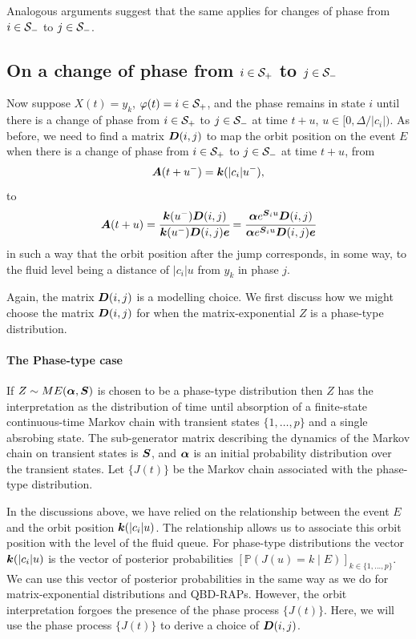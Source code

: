 Analogous arguments suggest that the same applies for changes of phase from \(i\in\mathcal{S}_-\) to \(j\in\mathcal{S}_-\). 

\subsection{On a change of phase from \(i\in\mathcal{S}_+\) to \(j\in\mathcal{S}_-\)} 
Now suppose \(X(t)=y_k\), \(\varphi(t)=i\in\mathcal{S}_+\), and the phase remains in state \(i\) until there is a change of phase from \(i\in\mathcal{S}_+\) to \(j\in\mathcal{S}_-\) at time \(t+u\), \(u\in[0,\Delta/|c_i|)\). %
As before, we need to find a matrix \(\boldsymbol D(i,j)\) to map the orbit position on the event \(E\) when there is a change of phase from \(i\in\mathcal{S}_+\) to \(j\in\mathcal{S}_-\) at time \(t+u\), from \[\boldsymbol A(t+u^-) = \boldsymbol k(|c_i|u^-),\] 
to 
\[\boldsymbol A(t+u) = \cfrac{\boldsymbol k(u^-)\boldsymbol D(i,j)}{\boldsymbol k(u^-)\boldsymbol D(i,j)\boldsymbol e}=\cfrac{\boldsymbol\alpha e^{\boldsymbol S_iu} \boldsymbol D(i,j)}{\boldsymbol\alpha e^{\boldsymbol S_iu}\boldsymbol D(i,j)\boldsymbol e}\]
in such a way that the orbit position after the jump corresponds, in some way, to the fluid level being a distance of \(|c_i|u\) from \(y_k\) in phase \(j\). 

Again, the matrix \(\boldsymbol D(i,j)\) is a modelling choice. We first discuss how we might choose the matrix \(\boldsymbol D(i,j)\) for when the matrix-exponential \(Z\) is a phase-type distribution. 

\paragraph{The Phase-type case}
If \(Z\sim ME(\boldsymbol \alpha, \boldsymbol S)\) is chosen to be a phase-type distribution then \(Z\) has the interpretation as the distribution of time until absorption of a finite-state continuous-time Markov chain with transient states \(\{1,\dots,p\}\) and a single absrobing state. The sub-generator matrix describing the dynamics of the Markov chain on transient states is \(\boldsymbol S\), and \(\boldsymbol \alpha\) is an initial probability distribution over the transient states. Let \(\{J(t)\}\) be the Markov chain associated with the phase-type distribution. 

In the discussions above, we have relied on the relationship between the event \(E\) and the orbit position \(\displaystyle \boldsymbol k(|c_i|u)\). The relationship allows us to associate this orbit position with the level of the fluid queue. For phase-type distributions the vector \(\boldsymbol k(|c_i|u)\) is the vector of posterior probabilities \(\left[\mathbb P(J(u)=k \mid E)\right]_{k\in\{1,...,p\}}\). We can use this vector of posterior probabilities in the same way as we do for matrix-exponential distributions and QBD-RAPs. However, the orbit interpretation forgoes the presence of the phase process \(\{J(t)\}\). Here, we will use the phase process \(\{J(t)\}\) to derive a choice of \(\boldsymbol D(i,j)\). 

